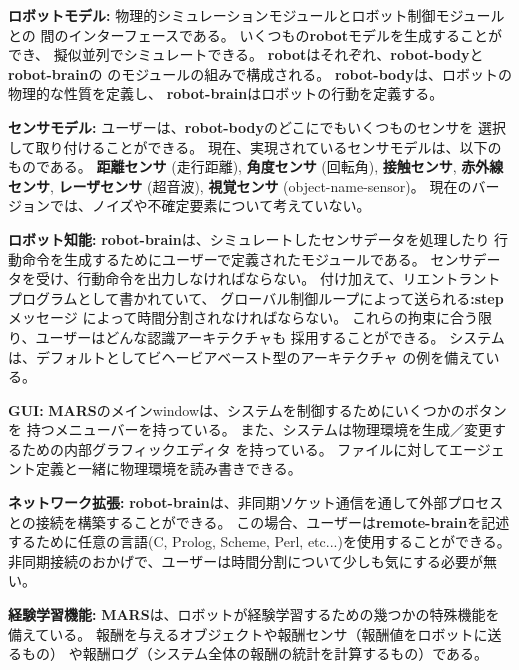 {\bf ロボットモデル:}
物理的シミュレーションモジュールとロボット制御モジュールとの
間のインターフェースである。
いくつもの{\bf robot}モデルを生成することができ、
擬似並列でシミュレートできる。
{\bf robot}はそれぞれ、{\bf robot-body}と{\bf robot-brain}の
のモジュールの組みで構成される。
{\bf robot-body}は、ロボットの物理的な性質を定義し、
{\bf robot-brain}はロボットの行動を定義する。

{\bf センサモデル:}
ユーザーは、{\bf robot-body}のどこにでもいくつものセンサを
選択して取り付けることができる。
現在、実現されているセンサモデルは、以下のものである。
{\bf 距離センサ} (走行距離), {\bf 角度センサ} (回転角),
{\bf 接触センサ}, {\bf 赤外線センサ}, {\bf レーザセンサ} (超音波), 
{\bf 視覚センサ} (object-name-sensor)。
現在のバージョンでは、ノイズや不確定要素について考えていない。

{\bf ロボット知能:}
{\bf robot-brain}は、シミュレートしたセンサデータを処理したり
行動命令を生成するためにユーザーで定義されたモジュールである。
センサデータを受け、行動命令を出力しなければならない。
付け加えて、リエントラントプログラムとして書かれていて、
グローバル制御ループによって送られる{\bf :step}メッセージ
によって時間分割されなければならない。
これらの拘束に合う限り、ユーザーはどんな認識アーキテクチャも
採用することができる。
システムは、デフォルトとしてビヘービアベースト型のアーキテクチャ
の例を備えている。

{\bf GUI:}
{\bf MARS}のメインwindowは、システムを制御するためにいくつかのボタンを
持つメニューバーを持っている。
また、システムは物理環境を生成／変更するための内部グラフィックエディタ
を持っている。
ファイルに対してエージェント定義と一緒に物理環境を読み書きできる。

{\bf ネットワーク拡張:}
{\bf robot-brain}は、非同期ソケット通信を通して外部プロセス
との接続を構築することができる。
この場合、ユーザーは{\bf remote-brain}を記述するために任意の言語(C,
Prolog, Scheme, Perl, etc...)を使用することができる。
非同期接続のおかげで、ユーザーは時間分割について少しも気にする必要が無い。

{\bf 経験学習機能:}
{\bf MARS}は、ロボットが経験学習するための幾つかの特殊機能を備えている。
報酬を与えるオブジェクトや報酬センサ（報酬値をロボットに送るもの）
や報酬ログ（システム全体の報酬の統計を計算するもの）である。
